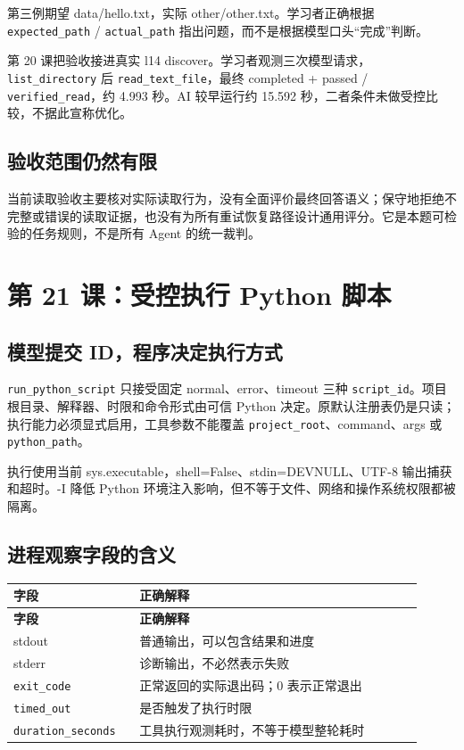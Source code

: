 第三例期望 data/hello.txt，实际 other/other.txt。学习者正确根据 \nolinkurl{expected_path} / \nolinkurl{actual_path} 指出问题，而不是根据模型口头“完成”判断。

第 20 课把验收接进真实 l14 discover。学习者观测三次模型请求，\nolinkurl{list_directory} 后 \nolinkurl{read_text_file}，最终 completed + passed / \nolinkurl{verified_read}，约 4.993 秒。AI 较早运行约 15.592 秒，二者条件未做受控比较，不据此宣称优化。

\subsection{验收范围仍然有限}

当前读取验收主要核对实际读取行为，没有全面评价最终回答语义；保守地拒绝不完整或错误的读取证据，也没有为所有重试恢复路径设计通用评分。它是本题可检验的任务规则，不是所有 Agent 的统一裁判。

\section{第 21 课：受控执行 Python 脚本}

\subsection{模型提交 ID，程序决定执行方式}

\nolinkurl{run_python_script} 只接受固定 normal、error、timeout 三种 \nolinkurl{script_id}。项目根目录、解释器、时限和命令形式由可信 Python 决定。原默认注册表仍是只读；执行能力必须显式启用，工具参数不能覆盖 \nolinkurl{project_root}、command、args 或 \nolinkurl{python_path}。

执行使用当前 sys.executable，shell=False、stdin=DEVNULL、UTF-8 输出捕获和超时。-I 降低 Python 环境注入影响，但不等于文件、网络和操作系统权限都被隔离。

\subsection{进程观察字段的含义}

{\small\setlength{\tabcolsep}{4pt}
\renewcommand{\arraystretch}{1.25}
\begin{longtable}{>{\raggedright\arraybackslash}p{0.28\linewidth}>{\raggedright\arraybackslash}p{0.63\linewidth}}
\toprule
\textbf{字段} & \textbf{正确解释} \\
\midrule\endfirsthead
\toprule
\textbf{字段} & \textbf{正确解释} \\
\midrule\endhead
\bottomrule\endfoot
stdout & 普通输出，可以包含结果和进度 \\
stderr & 诊断输出，不必然表示失败 \\
\nolinkurl{exit_code} & 正常返回的实际退出码；0 表示正常退出 \\
\nolinkurl{timed_out} & 是否触发了执行时限 \\
\nolinkurl{duration_seconds} & 工具执行观测耗时，不等于模型整轮耗时 \\
\end{longtable}}

